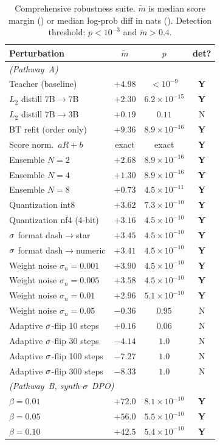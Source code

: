 \begin{table}[h]
\centering
\small
\begin{tabular}{lccc}
\toprule
Perturbation & $\tilde{m}$ & $p$ & det? \\
\midrule
\multicolumn{4}{l}{\emph{\verifya{} (Pathway~A)}} \\
Teacher (baseline) & $+4.98$ & $<10^{-9}$ & \textbf{Y} \\
$L_2$ distill 7B$\to$7B & $+2.30$ & $6.2{\times}10^{-15}$ & \textbf{Y} \\
$L_2$ distill 7B$\to$3B & $+0.19$ & $0.11$ & N \\
BT refit (order only) & $+9.36$ & $8.9{\times}10^{-16}$ & \textbf{Y} \\
Score norm.\ $aR{+}b$ & exact & exact & \textbf{Y} \\
Ensemble $N{=}2$ & $+2.68$ & $8.9{\times}10^{-16}$ & \textbf{Y} \\
Ensemble $N{=}4$ & $+1.30$ & $8.9{\times}10^{-16}$ & \textbf{Y} \\
Ensemble $N{=}8$ & $+0.73$ & $4.5{\times}10^{-11}$ & \textbf{Y} \\
Quantization int8 & $+3.62$ & $7.3{\times}10^{-10}$ & \textbf{Y} \\
Quantization nf4 (4-bit) & $+3.16$ & $4.5{\times}10^{-10}$ & \textbf{Y} \\
$\sigma$ format dash$\to$star & $+3.45$ & $4.5{\times}10^{-10}$ & \textbf{Y} \\
$\sigma$ format dash$\to$numeric & $+3.41$ & $4.5{\times}10^{-10}$ & \textbf{Y} \\
Weight noise $\sigma_n{=}0.001$ & $+3.90$ & $4.5{\times}10^{-10}$ & \textbf{Y} \\
Weight noise $\sigma_n{=}0.005$ & $+3.58$ & $4.5{\times}10^{-10}$ & \textbf{Y} \\
Weight noise $\sigma_n{=}0.01$ & $+2.96$ & $5.1{\times}10^{-10}$ & \textbf{Y} \\
Weight noise $\sigma_n{=}0.05$ & $-0.36$ & $0.95$ & N \\
Adaptive $\sigma$-flip 10 steps & $+0.16$ & $0.06$ & N \\
Adaptive $\sigma$-flip 30 steps & $-4.14$ & $1.0$ & N \\
Adaptive $\sigma$-flip 100 steps & $-7.27$ & $1.0$ & N \\
Adaptive $\sigma$-flip 300 steps & $-8.33$ & $1.0$ & N \\
\midrule
\multicolumn{4}{l}{\emph{\verifyc{} (Pathway~B, synth-$\sigma$ DPO)}} \\
$\beta{=}0.01$ & $+72.0$ & $8.1{\times}10^{-10}$ & \textbf{Y} \\
$\beta{=}0.05$ & $+56.0$ & $5.5{\times}10^{-10}$ & \textbf{Y} \\
$\beta{=}0.10$ & $+42.5$ & $5.4{\times}10^{-10}$ & \textbf{Y} \\
\bottomrule
\end{tabular}
\caption{Comprehensive robustness suite. $\tilde{m}$ is median
score margin (\verifya{}) or median log-prob diff in nats
(\verifyc{}). Detection threshold: $p<10^{-3}$ and $\tilde{m}>0.4$.}
\label{tab:robustness-summary}
\end{table}

